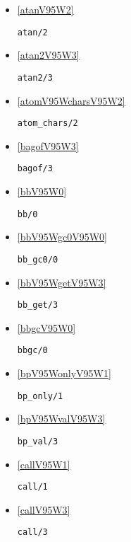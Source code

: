 \begin{itemize}
\item \ref{atanV95W2} 
\begin{verbatim}
atan/2
\end{verbatim}

\item \ref{atan2V95W3} 
\begin{verbatim}
atan2/3
\end{verbatim}

\item \ref{atomV95WcharsV95W2} 
\begin{verbatim}
atom_chars/2
\end{verbatim}

\item \ref{bagofV95W3} 
\begin{verbatim}
bagof/3
\end{verbatim}

\item \ref{bbV95W0} 
\begin{verbatim}
bb/0
\end{verbatim}

\item \ref{bbV95Wgc0V95W0} 
\begin{verbatim}
bb_gc0/0
\end{verbatim}

\item \ref{bbV95WgetV95W3} 
\begin{verbatim}
bb_get/3
\end{verbatim}

\item \ref{bbgcV95W0} 
\begin{verbatim}
bbgc/0
\end{verbatim}

\item \ref{bpV95WonlyV95W1} 
\begin{verbatim}
bp_only/1
\end{verbatim}

\item \ref{bpV95WvalV95W3} 
\begin{verbatim}
bp_val/3
\end{verbatim}

\item \ref{callV95W1} 
\begin{verbatim}
call/1
\end{verbatim}

\item \ref{callV95W3} 
\begin{verbatim}
call/3
\end{verbatim}


\end{itemize}
